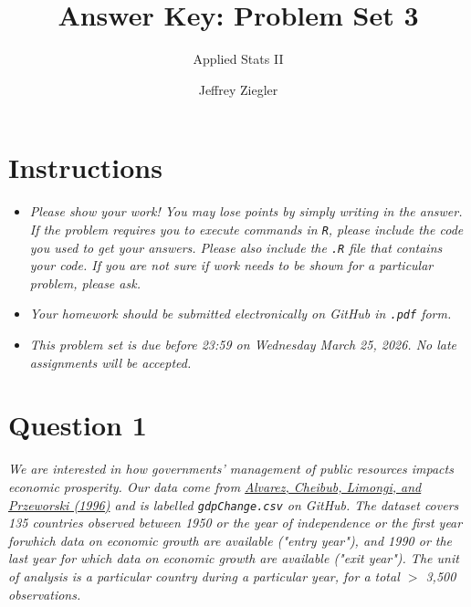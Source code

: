 \documentclass[12pt,letterpaper]{article}
\title{Answer Key: Problem Set 3}
\date{Jeffrey Ziegler}
\author{Applied Stats II}
\begin{document}
	\maketitle
	
	\section*{Instructions}
	\begin{itemize}
		\item \textit{Please show your work! You may lose points by simply writing in the answer. If the problem requires you to execute commands in \texttt{R}, please include the code you used to get your answers. Please also include the \texttt{.R} file that contains your code. If you are not sure if work needs to be shown for a particular problem, please ask.}
			\item \textit{Your homework should be submitted electronically on GitHub in \texttt{.pdf} form.}
			\item \textit{This problem set is due before 23:59 on Wednesday March 25, 2026. No late assignments will be accepted.}

	\end{itemize}
	\vspace{.25cm}
	
	\section*{Question 1}
	\vspace{.25cm}
\noindent \emph{We are interested in how governments' management of public resources impacts economic prosperity. Our data come from \href{https://www.researchgate.net/profile/Adam_Przeworski/publication/240357392_Classifying_Political_Regimes/links/0deec532194849aefa000000/Classifying-Political-Regimes.pdf}{Alvarez, Cheibub, Limongi, and Przeworski (1996)} and is labelled \texttt{gdpChange.csv} on GitHub. The dataset covers 135 countries observed between 1950 or the year of independence or the first year forwhich data on economic growth are available ("entry year"), and 1990 or the last year for which data on economic growth are available ("exit year"). The unit of analysis is a particular country during a particular year, for a total $>$ 3,500 observations. }
\end{document}
